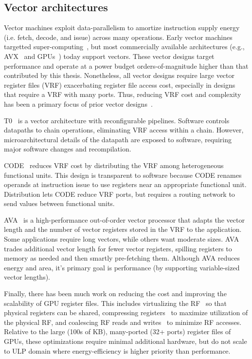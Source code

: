\subsection{Vector architectures}
\label{chapter:background:program:vector}
Vector machines exploit data-parallelism to amortize instruction supply energy (i.e. fetch, decode, and issue) across many operations.
% 
Early vector machines targetted super-computing~\cite{cray_patent}, but most commercially available architectures (e.g., AVX~\cite{avx} and GPUs~\cite{fermi}) today support vectors.
% 
These vector designs target performance and operate at a power budget
orders-of-magnitude higher than that contributed by this thesis.
% 
Nonetheless, all vector designs require large vector register files (VRF)
exacerbating register file access cost, especially in designs that require a
VRF with many ports. 
% 
Thus, reducing VRF cost and complexity has been a primary focus of prior vector
designs~\cite{asanovic1996t0,kozyrakis2003overcoming}.

T0~\cite{asanovic1996t0,wawrzynek1996spert} is a vector architecture with
reconfigurable pipelines. 
% 
Software controls datapaths to chain operations,
eliminating VRF access within a chain.  
% 
However, microarchitectural details of
the datapath are exposed to software, requiring major software changes and
recompilation.

CODE~\cite{kozyrakis2003overcoming} reduces VRF cost by distributing the VRF
among heterogeneous functional units.
% 
This design is transparent to software 
because CODE renames operands at instruction issue
to use registers near an appropriate functional unit.
% 
Distribution lets CODE reduce VRF ports, but requires a routing network
to send values between functional units.

AVA~\cite{lazo2021adaptable} is a high-performance out-of-order vector processor that adapts the vector length and the number of vector registers stored in the VRF to the application.
% 
Some applications require long vectors, while others want moderate sizes.
% 
AVA trades additional vector length for fewer vector registers, spilling registers to memory as needed and then smartly pre-fetching them.
% 
Although AVA reduces energy and area, it's primary goal is performance (by supporting variable-sized vector lengths).

Finally, there has been much work on reducing the cost and improving the scalability of GPU register files.
% 
This includes virtualizing the RF~\cite{jeon2015gpu,vijaykumar2016zorua} so that physical registers can be shared, compressing registers~\cite{lee2015warped} to maximize utilization of the physical RF, and coalescing RF reads and writes~\cite{asghari2019corf} to minimize RF accesses. 
% 
Relative to the large (100s of KB), many-ported (32+ ports) register files of GPUs, these optimizations require minimal additional hardware, but do not scale to ULP domain where energy-efficiency is higher priority than performance.


